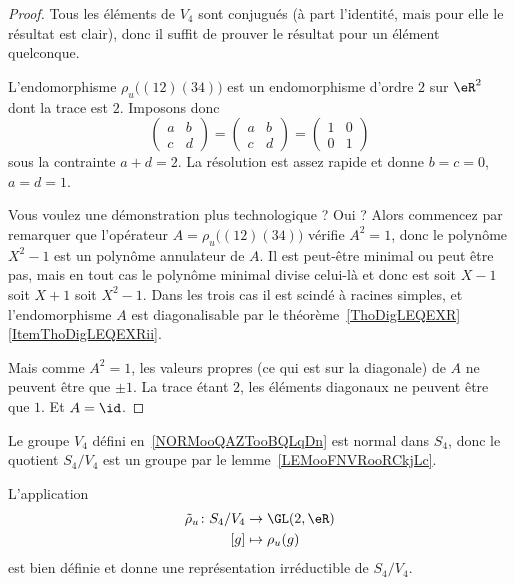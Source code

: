 \begin{proof}
	Tous les éléments de \( V_4\) sont conjugués (à part l'identité, mais pour elle le résultat est clair), donc il suffit de prouver le résultat pour un élément quelconque.

	L'endomorphisme \( \rho_u\big( (12)(34) \big)\) est un endomorphisme d'ordre \( 2\) sur \( \eR^2\) dont la trace est \( 2\). Imposons donc
	\begin{equation}
		\begin{pmatrix}
			a & b \\
			c & d
		\end{pmatrix}=\begin{pmatrix}
			a & b \\
			c & d
		\end{pmatrix}=\begin{pmatrix}
			1 & 0 \\
			0 & 1
		\end{pmatrix}
	\end{equation}
	sous la contrainte \( a+d=2\). La résolution est assez rapide et donne \( b=c=0\), \( a=d=1\).

	Vous voulez une démonstration plus technologique ? Oui ? Alors commencez par remarquer que l'opérateur \( A=\rho_u\big( (12)(34) \big)\) vérifie \( A^2=1\), donc le polynôme \( X^2-1\) est un polynôme annulateur de \( A\). Il est peut-être minimal ou peut être pas, mais en tout cas le polynôme minimal divise celui-là et donc est soit \( X-1\) soit \( X+1\) soit \( X^2-1\). Dans les trois cas il est scindé à racines simples, et l'endomorphisme \( A\) est diagonalisable par le théorème~\ref{ThoDigLEQEXR}\ref{ItemThoDigLEQEXRii}.

	Mais comme \( A^2=1\), les valeurs propres (ce qui est sur la diagonale) de \( A\) ne peuvent être que \( \pm1\). La trace étant \( 2\), les éléments diagonaux ne peuvent être que \( 1\). Et \( A=\id\).
\end{proof}


Le groupe \( V_4\) défini en~\ref{NORMooQAZTooBQLqDn} est normal dans \( S_4\), donc le quotient \( S_4/V_4\) est un groupe par le lemme~\ref{LEMooFNVRooRCkjLc}.

\begin{lemma}
	L'application
	\begin{equation}
		\begin{aligned}
			\tilde \rho_u\colon S_4/V_4 & \to \GL(2,\eR)    \\
			[g]                         & \mapsto \rho_u(g)
		\end{aligned}
	\end{equation}
	est bien définie et donne une représentation irréductible de \( S_4/V_4\).
\end{lemma}

